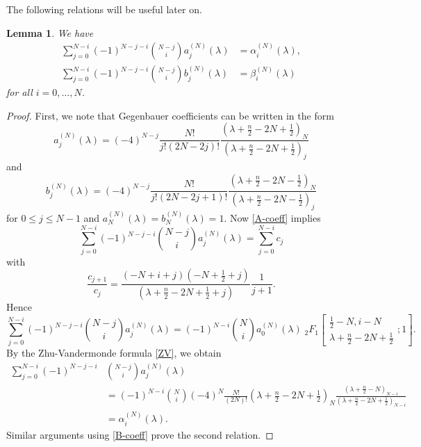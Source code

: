 \documentclass[a4paper,12pt,reqno]{amsart}
\newtheorem{lem}[theorem]{Lemma}
\numberwithin{theorem}{subsection}
\numberwithin{equation}{section}
\begin{document}
The following relations will be useful later on.

\begin{lem}\label{RelationJacobiGegenbauer} We have
\begin{align*}
   \sum_{j=0}^{N-i}(-1)^{N-j-i} \binom{N-j}{i}a_j^{(N)}(\lambda) & = \alpha^{(N)}_i(\lambda), \\
   \sum_{j=0}^{N-i}(-1)^{N-j-i} \binom{N-j}{i}b_j^{(N)}(\lambda) & = \beta^{(N)}_i(\lambda)
\end{align*}
for all $i=0,\dots,N$.
\end{lem}

\begin{proof} First, we note that Gegenbauer coefficients can be written in the
form
\begin{equation}\label{A-coeff}
   a_j^{(N)}(\lambda) = (-4)^{N-j} \frac{N!}{j!(2N\!-\!2j)!}
   \frac{(\lambda\!+\!\tfrac{n}{2}\!-\!2N\!+\!\tfrac 12)_N}{(\lambda\!+\!\tfrac{n}{2}\!-\!2N\!+\!\tfrac 12)_j}
\end{equation}
and
\begin{equation}\label{B-coeff}
   b_j^{(N)}(\lambda) = (-4)^{N-j} \frac{N!}{j!(2N\!-\!2j\!+\!1)!}
   \frac{(\lambda\!+\!\tfrac n2\!-\!2N\!-\!\tfrac 12)_N}{(\lambda\!+\!\tfrac n2\!-\!2N\!-\!\tfrac 12)_j}
\end{equation}
for $0\leq j\leq N-1$ and $a_N^{(N)}(\lambda) = b_N^{(N)}(\lambda)=1$. Now
\eqref{A-coeff} implies
\begin{equation*}
   \sum_{j=0}^{N-i}(-1)^{N-j-i} \binom{N-j}{i} a_j^{(N)}(\lambda) = \sum_{j=0}^{N-i} c_j
\end{equation*}
with
$$
   \frac{c_{j+1}}{c_j} = \frac{(-N\!+\!i\!+\!j)(-N\!+\tfrac{1}{2}\!+\!j)}
   {(\lambda\!+\!\tfrac{n}{2}\!-\!2N\!+\!\tfrac{1}{2}\!+\!j)} \frac{1}{j\!+\!1}.
$$
Hence
$$
   \sum_{j=0}^{N-i}(-1)^{N-j-i} \binom{N-j}{i} a_j^{(N)}(\lambda) = (-1)^{N-i}
   \binom{N}{i} a_0^{(N)}(\lambda) \; {}_2F_1\left[ \begin{matrix} \tfrac{1}{2}-N,i-N\\
   \lambda+\tfrac{n}{2}-2N+\tfrac{1}{2} \end{matrix} ;1\right].
$$
By the Zhu-Vandermonde formula \eqref{ZV}, we obtain
\begin{align*}
   \sum_{j=0}^{N-i}(-1)^{N-j-i} & \binom{N-j}{i} a_j^{(N)}(\lambda) \\
   & = (-1)^{N-i}
   \binom{N}{i} (-4)^N \frac{N!}{(2N)!} (\lambda\!+\!\tfrac{n}{2}\!-\!2N\!+\!\tfrac{1}{2})_N
   \frac{(\lambda\!+\!\tfrac{n}{2}\!-\!N)_{N-i}}{(\lambda\!+\!\tfrac{n}{2}\!-\!2N+\!\tfrac{1}{2})_{N-i}} \\
   & = \alpha^{(N)}_i(\lambda).
\end{align*}
Similar arguments using \eqref{B-coeff} prove the second relation.
\end{proof}
\end{document}
